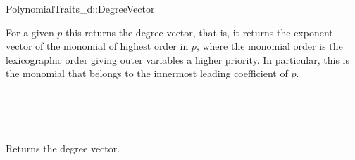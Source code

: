 \begin{ccRefConcept}{PolynomialTraits_d::DegreeVector}

\ccDefinition

For a given  $p$ 
this  returns the degree vector, that is, 
it returns the exponent vector of the monomial of highest order in $p$, 
where the monomial order is the lexicographic order giving outer 
variables a higher priority. In particular, this is the monomial 
that belongs to the innermost leading coefficient of $p$.  

\ccRefines 
{}\\
\\
\\


\ccTypes


\ccGlue
{}

\ccOperations
{}
         {Returns the degree vector.}


\ccSeeAlso

\\
\\
\\
\\
\\

\end{ccRefConcept}

